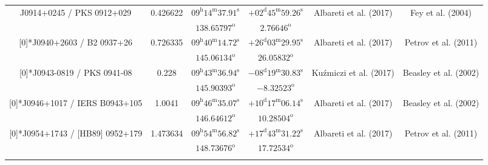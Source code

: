 \begin{landscape}
\begin{longtable}{cccccc}
  \multirow{2}[0]{*}{J0914+0245 / PKS 0912+029} & \multirow{2}[0]{*}{0.426622} &  
    $09^\text{h}14^\text{m}37.91^\text{s}$  & $+02^\text{d}45^\text{m}59.26^\text{s}$  & 
    \multirow{2}[0]{*}{Albareti et al. (2017) \cite{RedRef9_2017}}& \multirow{2}[0]{*}{Fey et al. (2004) \cite{CoordRef2_2004}} \\*
    & & $ 138.65797 ^\text{o}$ & $ 2.76646 ^\text{o}$ & & \\ \addlinespace 

  \multirow{2}[0]{*}{J0940+2603 / B2 0937+26} & \multirow{2}[0]{*}{0.726335} &  
    $ 09^\text{h}40^\text{m}14.72^\text{s}$  & $+26^\text{d}03^\text{m}29.95^\text{s}$  & 
    \multirow{2}[0]{*}{Albareti et al. (2017) \cite{RedRef9_2017}}& \multirow{2}[0]{*}{Petrov et al. (2011) \cite{CoordRef31_2011}} \\*
     & & $ 145.06134 ^\text{o}$ & $ 26.05832 ^\text{o}$ & & \\ \addlinespace 

 \multirow{2}[0]{*}{J0943-0819 / PKS 0941-08} & \multirow{2}[0]{*}{0.228} &  
    $09^\text{h}43^\text{m}36.94^\text{s}$  & $-08^\text{d}19^\text{m}30.83^\text{s}$  & 
    \multirow{2}[0]{*}{Ku{\'z}miczi et al. (2017) \cite{RedRef32_2017}}& \multirow{2}[0]{*}{Beasley et al. (2002) \cite{CoordRef4_2002}} \\*
    & & $ 145.90393 ^\text{o}$ & $ -8.32523 ^\text{o}$ & & \\ \addlinespace 

\multirow{2}[0]{*}{J0946+1017 / IERS B0943+105} & \multirow{2}[0]{*}{1.0041} &  
    $09^\text{h}46^\text{m}35.07^\text{s}$  & $+10^\text{d}17^\text{m}06.14^\text{s}$  & 
    \multirow{2}[0]{*}{Albareti et al. (2017) \cite{RedRef9_2017}}& \multirow{2}[0]{*}{Beasley et al. (2002) \cite{CoordRef4_2002}} \\*
    & & $ 146.64612^\text{o}$ & $ 10.28504^\text{o}$ & & \\ \addlinespace 

  \multirow{2}[0]{*}{J0954+1743 / [HB89] 0952+179} & \multirow{2}[0]{*}{1.473634} &  
    $09^\text{h}54^\text{m}56.82^\text{s} $  & $+17^\text{d}43^\text{m}31.22^\text{s} $  & 
    \multirow{2}[0]{*}{Albareti et al. (2017) \cite{RedRef9_2017}}& \multirow{2}[0]{*}{Petrov et al. (2011) \cite{CoordRef31_2011}} \\*
     & & $148.73676^\text{o}$ & $17.72534^\text{o}$ & & \\ \addlinespace 


\end{longtable}
\end{landscape}
